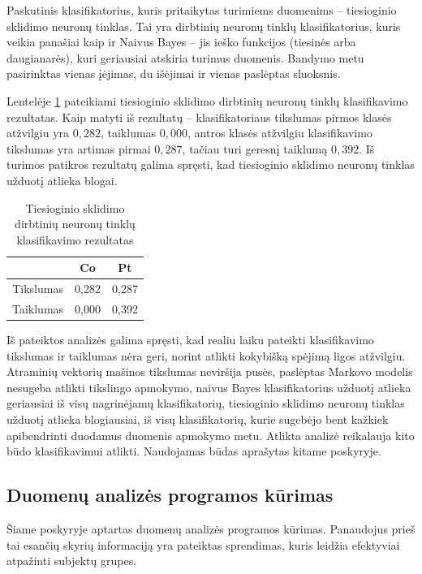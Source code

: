 \documentclass[]{vgtuef}
\begin{document}
Paskutinis klasifikatorius, kuris pritaikytas turimiems duomenims -- tiesioginio sklidimo neuronų tinklas. Tai yra dirbtinių neuronų tinklų klasifikatorius, kuris veikia panašiai kaip ir Naivus Bayes -- jis ieško funkcijos (tiesinės arba daugianarės), kuri geriausiai atskiria turimus duomenis. Bandymo metu pasirinktas vienas įėjimas, du išėjimai ir vienas paslėptas sluoksnis. 

Lentelėje \ref{table:ffn_scores} pateikiami tiesioginio sklidimo dirbtinių neuronų tinklų klasifikavimo rezultatas. Kaip matyti iš rezultatų -- klasifikatoriaus tikslumas pirmos klasės atžvilgiu yra $0,282$, taiklumas $0,000$, antros klasės atžvilgiu klasifikavimo tikslumas yra artimas pirmai $0,287$, tačiau turi geresnį taiklumą $0,392$. Iš turimos patikros rezultatų galima spręsti, kad tiesioginio sklidimo neuronų tinklas užduotį atlieka blogai.

\begin{table}
  \centering
  \renewcommand{\arraystretch}{1.3}
  \caption{Tiesioginio sklidimo dirbtinių neuronų tinklų klasifikavimo rezultatas}
  \label{table:ffn_scores}
  \begin{tabular}{|c|c|c|} \hline
    & Co & Pt \\ \hline
    Tikslumas & 0,282 & 0,287 \\ \hline
    Taiklumas & 0,000 & 0,392 \\ \hline
  \end{tabular}
\end{table}

Iš pateiktos analizės galima spręsti, kad realiu laiku pateikti klasifikavimo tikslumas ir taiklumas nėra geri, norint atlikti kokybišką spėjimą ligos atžvilgiu. Atraminių vektorių mašinos tikslumas neviršija pusės, paslėptas Markovo modelis nesugeba atlikti tikslingo apmokymo, naivus Bayes klasifikatorius užduotį atlieka geriausiai iš visų nagrinėjamų klasifikatorių, tiesioginio sklidimo neuronų tinklas užduotį atlieka blogiausiai, iš visų klasifikatorių, kurie sugebėjo bent kažkiek apibendrinti duodamus duomenis apmokymo metu. Atlikta analizė reikalauja kito būdo klasifikavimui atlikti. Naudojamas būdas aprašytas kitame poskyryje.

\subsection{Duomenų analizės programos kūrimas}

Šiame poskyryje aptartas duomenų analizės programos kūrimas. Panaudojus prieš tai esančių skyrių informaciją yra pateiktas sprendimas, kuris leidžia efektyviai atpažinti subjektų grupes.
\end{document}

